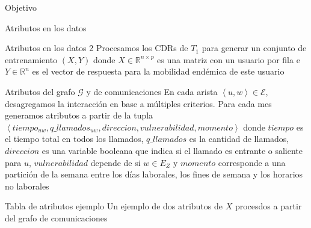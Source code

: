 \documentclass[xcolor=x11names]{beamer}
\def\calE{\mathcal{E}}
\def\calG{\mathcal{G}}
\begin{document}
\begin{frame}{Objetivo}
\begin{frame}{Atributos en los datos}
\end{frame}

\begin{frame}{Atributos en los datos 2}
	Procesamos los CDRs de $T_1$ para generar un conjunto de entrenamiento $(X,Y)$ donde $X \in \mathbb{R}^{n \times p}$ es una matriz con un usuario por fila e $Y \in \mathbb{R}^n$ es el vector de respuesta para la mobilidad endémica de este usuario

	\bigskip

	\begin{block}{Atributos del grafo $\calG$ y de comunicaciones}
		En cada arista $\left< u, w \right> \in \calE$, desagregamos la interacción en base a múltiples criterios. Para cada mes generamos atributos a partir de la tupla  $\left< tiempo_{uw}, q\_llamados_{uw}, direcci on, vulnerabilidad, momento \right>$ donde $tiempo$ es el tiempo total en todos los llamados, $q\_llamados$ es la cantidad de llamados, $direccion$ es una variable booleana que indica si el llamado es entrante o saliente para $u$, $vulnerabilidad$ depende de si $w \in E_Z$ y $momento$ corresponde a una partición de la semana entre los días laborales, los fines de semana y los horarios no laborales
	\end{block}

\end{frame}


\begin{frame}{Tabla de atributos ejemplo}
Un ejemplo de dos atributos de $X$ procesdos a partir del grafo de comunicaciones
	\begin{table}[ht]
		\label{tab:data_example}
		\footnotesize
		\centering
	\end{table}


\end{frame}
\end{frame}
\end{document}
